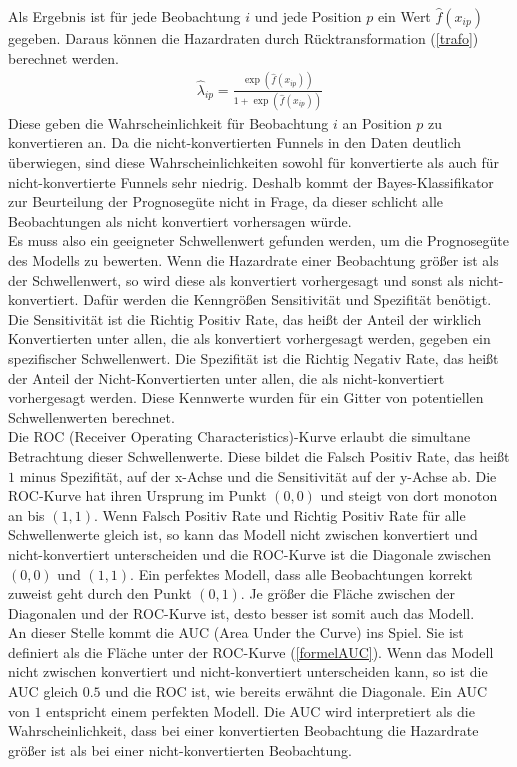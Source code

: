 Als Ergebnis ist für jede Beobachtung $i$ und jede Position $p$ ein Wert $\hat{f}(x_{ip})$ gegeben. Daraus können die Hazardraten durch Rücktransformation (\ref{trafo}) berechnet werden.
\begin{align}
	\hat{\lambda}_{ip} = \frac{\exp(\hat{f}(x_{ip}))}{1+\exp(\hat{f}(x_{ip}))} \label{trafo}
\end{align}
Diese geben die Wahrscheinlichkeit für Beobachtung $i$ an Position $p$ zu konvertieren an. Da die nicht-konvertierten Funnels in den Daten deutlich überwiegen, sind diese Wahrscheinlichkeiten sowohl für konvertierte als auch für nicht-konvertierte Funnels sehr niedrig. Deshalb kommt der Bayes-Klassifikator zur Beurteilung der Prognosegüte nicht in Frage, da dieser schlicht alle Beobachtungen als nicht konvertiert vorhersagen würde.\\
Es muss also ein geeigneter Schwellenwert gefunden werden, um die Prognosegüte des Modells zu bewerten. Wenn die Hazardrate einer Beobachtung größer ist als der Schwellenwert, so wird diese als konvertiert vorhergesagt und sonst als nicht-konvertiert. Dafür werden die Kenngrößen Sensitivität und Spezifität benötigt. Die Sensitivität ist die Richtig Positiv Rate, das heißt der Anteil der wirklich Konvertierten unter allen, die als konvertiert vorhergesagt werden, gegeben ein spezifischer Schwellenwert. Die Spezifität ist die Richtig Negativ Rate, das heißt der Anteil der Nicht-Konvertierten unter allen, die als nicht-konvertiert vorhergesagt werden. Diese Kennwerte wurden für ein Gitter von potentiellen Schwellenwerten berechnet.\\
Die ROC (Receiver Operating Characteristics)-Kurve erlaubt die simultane Betrachtung dieser Schwellenwerte. Diese bildet die Falsch Positiv Rate, das heißt $1$ minus Spezifität, auf der x-Achse und die Sensitivität auf der y-Achse ab. Die ROC-Kurve hat ihren Ursprung im Punkt $(0,0)$ und steigt von dort monoton an bis $(1,1)$. Wenn Falsch Positiv Rate und Richtig Positiv Rate für alle Schwellenwerte gleich ist, so kann das Modell nicht zwischen konvertiert und nicht-konvertiert unterscheiden und die ROC-Kurve ist die Diagonale zwischen $(0,0)$ und $(1,1)$. Ein perfektes Modell, dass alle Beobachtungen korrekt zuweist geht durch den Punkt $(0,1)$. Je größer die Fläche zwischen der Diagonalen und der ROC-Kurve ist, desto besser ist somit auch das Modell.\\
An dieser Stelle kommt die AUC (Area Under the Curve) ins Spiel. Sie ist definiert als die Fläche unter der ROC-Kurve (\ref{formelAUC}). Wenn das Modell nicht zwischen konvertiert und nicht-konvertiert unterscheiden kann, so ist die AUC gleich $0.5$ und die ROC ist, wie bereits erwähnt die Diagonale. Ein AUC von $1$ entspricht einem perfekten Modell. Die AUC wird interpretiert als die Wahrscheinlichkeit, dass bei einer konvertierten Beobachtung die Hazardrate größer ist als bei einer nicht-konvertierten Beobachtung.
